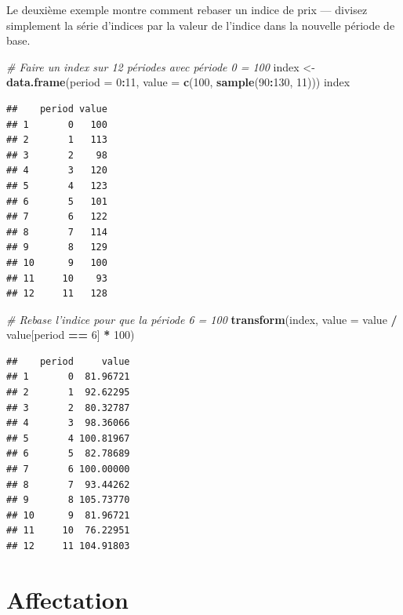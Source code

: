 \documentclass[]{article}
\newenvironment{Shaded}{\begin{snugshade}}{\end{snugshade}}
\newcommand{\CommentTok}[1]{\textcolor[rgb]{0.56,0.35,0.01}{\textit{#1}}}
\newcommand{\DataTypeTok}[1]{\textcolor[rgb]{0.13,0.29,0.53}{#1}}
\newcommand{\DecValTok}[1]{\textcolor[rgb]{0.00,0.00,0.81}{#1}}
\newcommand{\KeywordTok}[1]{\textcolor[rgb]{0.13,0.29,0.53}{\textbf{#1}}}
\newcommand{\NormalTok}[1]{#1}
\newcommand{\OperatorTok}[1]{\textcolor[rgb]{0.81,0.36,0.00}{\textbf{#1}}}
\newcommand{\StringTok}[1]{\textcolor[rgb]{0.31,0.60,0.02}{#1}}
\begin{document}
Le deuxième exemple montre comment rebaser un indice de prix --- divisez simplement la série d'indices par la valeur de l'indice dans la nouvelle période de base.

\begin{Shaded}
\begin{Highlighting}[]
\CommentTok{# Faire un index sur 12 périodes avec période 0 = 100}
\NormalTok{index <-}\StringTok{ }\KeywordTok{data.frame}\NormalTok{(}\DataTypeTok{period =} \DecValTok{0}\OperatorTok{:}\DecValTok{11}\NormalTok{, }\DataTypeTok{value =} \KeywordTok{c}\NormalTok{(}\DecValTok{100}\NormalTok{, }\KeywordTok{sample}\NormalTok{(}\DecValTok{90}\OperatorTok{:}\DecValTok{130}\NormalTok{, }\DecValTok{11}\NormalTok{)))}
\NormalTok{index}
\end{Highlighting}
\end{Shaded}

\begin{verbatim}
##    period value
## 1       0   100
## 2       1   113
## 3       2    98
## 4       3   120
## 5       4   123
## 6       5   101
## 7       6   122
## 8       7   114
## 9       8   129
## 10      9   100
## 11     10    93
## 12     11   128
\end{verbatim}

\begin{Shaded}
\begin{Highlighting}[]
\CommentTok{# Rebase l'indice pour que la période 6 = 100}
\KeywordTok{transform}\NormalTok{(index, }\DataTypeTok{value =}\NormalTok{ value }\OperatorTok{/}\StringTok{ }\NormalTok{value[period }\OperatorTok{==}\StringTok{ }\DecValTok{6}\NormalTok{] }\OperatorTok{*}\StringTok{ }\DecValTok{100}\NormalTok{)}
\end{Highlighting}
\end{Shaded}

\begin{verbatim}
##    period     value
## 1       0  81.96721
## 2       1  92.62295
## 3       2  80.32787
## 4       3  98.36066
## 5       4 100.81967
## 6       5  82.78689
## 7       6 100.00000
## 8       7  93.44262
## 9       8 105.73770
## 10      9  81.96721
## 11     10  76.22951
## 12     11 104.91803
\end{verbatim}

\hypertarget{affectation}{%
\section{Affectation}\label{affectation}}
\end{document}
